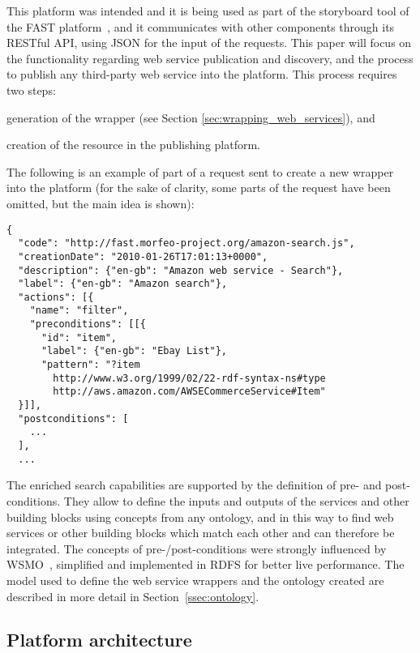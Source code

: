 This platform was intended and it is being used as part of the storyboard tool of the FAST platform~\cite{hoyer2009fast}, and it communicates with other components through its RESTful API, using JSON for the input of the requests. This paper will focus on the functionality regarding web service publication and discovery, and the process to publish any third-party web service into the platform. This process requires two steps:
\begin{inparaenum}[(i)]
	\item generation of the wrapper (see Section \ref{sec:wrapping_web_services}), and 
	\item creation of the resource in the publishing platform. 
\end{inparaenum}
The following is an example of part of a request sent to create a new wrapper into the platform (for the sake of clarity, some parts of the request have been omitted, but the main idea is shown):

\begin{listing}
\begin{verbatim}
{
  "code": "http://fast.morfeo-project.org/amazon-search.js",
  "creationDate": "2010-01-26T17:01:13+0000",
  "description": {"en-gb": "Amazon web service - Search"},
  "label": {"en-gb": "Amazon search"},
  "actions": [{
    "name": "filter",
    "preconditions": [[{
      "id": "item",
      "label": {"en-gb": "Ebay List"},
      "pattern": "?item
        http://www.w3.org/1999/02/22-rdf-syntax-ns#type
        http://aws.amazon.com/AWSECommerceService#Item"
  }]],
  "postconditions": [
    ...
  ],
  ...
\end{verbatim}
\label{lis:json_request}
\end{listing}

The enriched search capabilities are supported by the definition of pre- and post-conditions. They allow to define the inputs and outputs of the services and other building blocks using concepts from any ontology, and in this way to find web services or other building blocks which match each other and can therefore be integrated. The concepts of pre-/post-conditions were strongly influenced by WSMO~\cite{roman2005}, simplified and implemented in RDFS for better live performance. The model used to define the web service wrappers and the ontology created are described in more detail in Section~\ref{ssec:ontology}.

\subsection{Platform architecture}
\label{ssec:architecture}

